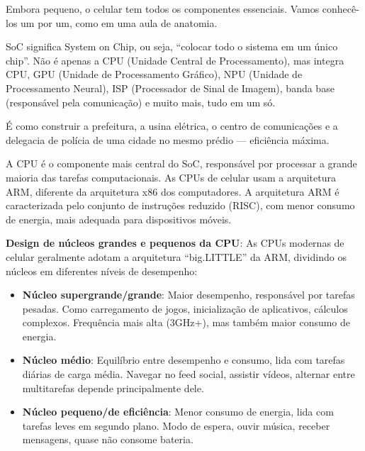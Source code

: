 


Embora pequeno, o celular tem todos os componentes essenciais. Vamos conhecê-los um por um, como em uma aula de anatomia.


SoC significa System on Chip, ou seja, “colocar todo o sistema em um único chip”. Não é apenas a CPU (Unidade Central de Processamento), mas integra CPU, GPU (Unidade de Processamento Gráfico), NPU (Unidade de Processamento Neural), ISP (Processador de Sinal de Imagem), banda base (responsável pela comunicação) e muito mais, tudo em um só.

É como construir a prefeitura, a usina elétrica, o centro de comunicações e a delegacia de polícia de uma cidade no mesmo prédio — eficiência máxima.


A CPU é o componente mais central do SoC, responsável por processar a grande maioria das tarefas computacionais. As CPUs de celular usam a arquitetura ARM, diferente da arquitetura x86 dos computadores. A arquitetura ARM é caracterizada pelo conjunto de instruções reduzido (RISC), com menor consumo de energia, mais adequada para dispositivos móveis.

\textbf{Design de núcleos grandes e pequenos da CPU}: As CPUs modernas de celular geralmente adotam a arquitetura “big.LITTLE” da ARM, dividindo os núcleos em diferentes níveis de desempenho:

\begin{itemize}
  \item \textbf{Núcleo supergrande/grande}: Maior desempenho, responsável por tarefas pesadas. Como carregamento de jogos, inicialização de aplicativos, cálculos complexos. Frequência mais alta (3GHz+), mas também maior consumo de energia.
  \item \textbf{Núcleo médio}: Equilíbrio entre desempenho e consumo, lida com tarefas diárias de carga média. Navegar no feed social, assistir vídeos, alternar entre multitarefas depende principalmente dele.
  \item \textbf{Núcleo pequeno/de eficiência}: Menor consumo de energia, lida com tarefas leves em segundo plano. Modo de espera, ouvir música, receber mensagens, quase não consome bateria.
\end{itemize}

